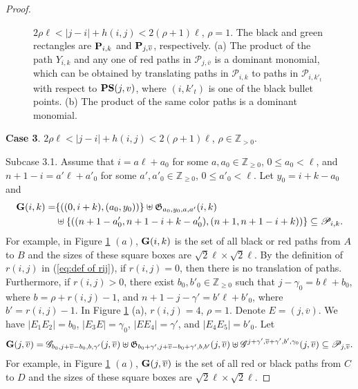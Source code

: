 \documentclass[12pt, reqno]{amsart}
\numberwithin{equation}{section}
\newcommand{\ZZ}{\mathbb{Z}}
\begin{document}
{\begin{proof}
\begin{figure}
\begin{minipage}[b]{0.48\textwidth}
{}
\end{minipage}
\caption{$2\rho \ell<|j-i|+h(i,j)< 2(\rho+1) \ell$, $\rho=1$. The black and green rectangles are ${\bf P}_{i,k}$ and ${\bf P}_{j,\overline{v}}$, respectively. (a) The product of the path $Y_{i,k}$ and any one of red paths in $\mathscr{P}_{j, \overline{v}}$ is a dominant monomial, which can be obtained by translating paths in $\mathscr{P}_{i,k}$ to paths in $\mathscr{P}_{i,k'_t}$ with respect to ${\bf PS}(j,v)$, where $(i,k'_t)$ is one of the black bullet points. (b) The product of the same color paths is a dominant monomial.} \label{F: figure grid 3}
\end{figure}

\textbf{Case 3}. $2\rho \ell <|j-i|+h(i,j)<2(\rho+1) \ell$, $\rho\in \ZZ_{>0}$.

Subcase 3.1. Assume that $i=a \ell+a_0$ for some $a, a_0\in \mathbb{Z}_{\geq 0}$, $0\leq a_0< \ell$, and $n+1-i=a' \ell+a'_0$ for some $a', a'_0\in \mathbb{Z}_{\geq 0}$, $0\leq a'_0< \ell$. Let $y_0=i+k-a_0$ and
\begin{align*}
{\bf G}(i,k)=&\{((0,i+k),(a_0,y_0))\}\uplus \mathfrak{G}_{a_0,y_0,a,a'}(i,k)\\
&\uplus \{((n+1-a'_0, n+1-i+k-a'_0),(n+1,n+1-i+k))\} \subseteq \mathscr{P}_{i,k}.
\end{align*}
For example, in Figure \ref{F: figure grid 3} $(a)$, ${\bf G}(i,k)$ is the set of all black or red paths from $A$ to $B$ and the sizes of these square boxes are $\sqrt{2}\ell\times \sqrt{2}\ell$.
By the definition of $r(i,j)$ in (\ref{eq:def of rij}), if $r(i,j)=0$, then there is no translation of paths. Furthermore, if $r(i, j) > 0$, there exist $b_0, b'_0\in \mathbb{Z}_{\geq 0}$ such that $j-\gamma_0=b \ell+b_0$, where $b=\rho+r(i,j)-1$, and $n+1-j-\gamma'=b' \ell+b'_0$, where $b'=r(i,j)-1$. In Figure \ref{F: figure grid 3} (a), $r(i,j)=4$, $\rho=1$. Denote $E=(j,\overline{v})$. We have $|E_1E_2|=b_0$, $|E_3E|=\gamma_0$, $|EE_4|=\gamma'$, and $|E_4E_5|=b'_0$. Let
\begin{align*}
{\bf G}(j,\overline{v})=\mathscr{G}_{b_0, j+\overline{v}-b_0, b, \gamma'}(j,\overline{v})\uplus\mathfrak{G}_{b_0+\gamma',j+\overline{v}-b_0+ \gamma', b, b'}(j,\overline{v})\uplus  \mathscr{G}^{j+\gamma', \overline{v}+\gamma', b', \gamma_0 }(j,\overline{v}) \subseteq \mathscr{P}_{j,\overline{v}}.
\end{align*}
For example, in Figure \ref{F: figure grid 3} $(a)$, ${\bf G}(j,\overline{v})$ is the set of all red or black paths from $C$ to $D$ and the sizes of these square boxes are $\sqrt{2}\ell\times \sqrt{2}\ell$.


\end{proof}}
\end{document}
